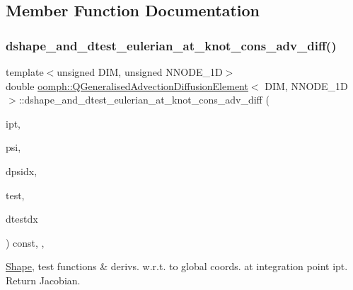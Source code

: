 \subsection{Member Function Documentation}
\mbox{\label{classoomph_1_1QGeneralisedAdvectionDiffusionElement_a86385db741884733eb3ec459cc40290d}} 
\subsubsection{\texorpdfstring{dshape\+\_\+and\+\_\+dtest\+\_\+eulerian\+\_\+at\+\_\+knot\+\_\+cons\+\_\+adv\+\_\+diff()}{dshape\_and\_dtest\_eulerian\_at\_knot\_cons\_adv\_diff()}}
{\footnotesize\ttfamily template$<$unsigned D\+IM, unsigned N\+N\+O\+D\+E\+\_\+1D$>$ \\
double \hyperlink{classoomph_1_1QGeneralisedAdvectionDiffusionElement}{oomph\+::\+Q\+Generalised\+Advection\+Diffusion\+Element}$<$ D\+IM, N\+N\+O\+D\+E\+\_\+1D $>$\+::dshape\+\_\+and\+\_\+dtest\+\_\+eulerian\+\_\+at\+\_\+knot\+\_\+cons\+\_\+adv\+\_\+diff (\begin{DoxyParamCaption}\item[{const unsigned \&}]{ipt,  }\item[{\hyperlink{classoomph_1_1Shape}{Shape} \&}]{psi,  }\item[{\hyperlink{classoomph_1_1DShape}{D\+Shape} \&}]{dpsidx,  }\item[{\hyperlink{classoomph_1_1Shape}{Shape} \&}]{test,  }\item[{\hyperlink{classoomph_1_1DShape}{D\+Shape} \&}]{dtestdx }\end{DoxyParamCaption}) const\hspace{0.3cm}{\ttfamily [inline]}, {\ttfamily [protected]}, {\ttfamily [virtual]}}



\hyperlink{classoomph_1_1Shape}{Shape}, test functions \& derivs. w.\+r.\+t. to global coords. at integration point ipt. Return Jacobian. 

